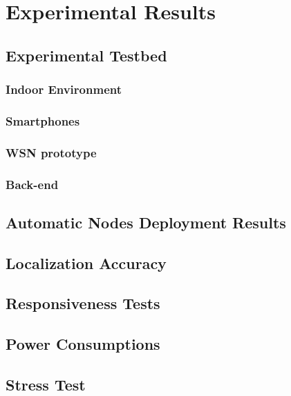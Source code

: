 %
%
\chapter{Experimental Results}
%
\label{cap:results}
%
\section{Experimental Testbed}
\subsection{Indoor Environment}
\subsection{Smartphones}
\subsection{WSN prototype}
\subsection{Back-end}
\section{Automatic Nodes Deployment Results}
\section{Localization Accuracy}
\section{Responsiveness Tests}
\section{Power Consumptions}
\section{Stress Test}
%
